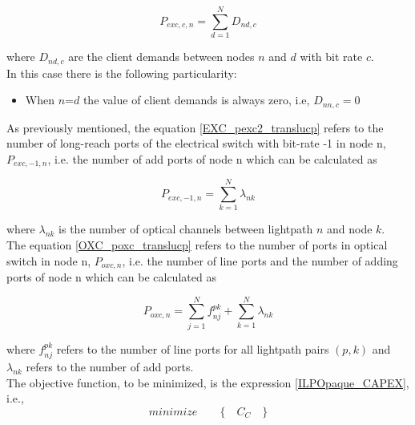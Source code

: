 \begin{equation}
P_{exc,c,n} = \sum_{d=1}^{N} D_{nd,c}
\label{EXC_pexc1_translucp}
\end{equation}

\vspace{11pt}
\noindent
where $D_{nd,c}$ are the client demands between nodes $n$ and $d$ with bit rate $c$.\\

In this case there is the following particularity:
\begin{itemize}
  \item When $n$=$d$ the value of client demands is always zero, i.e, $D_{nn,c}=0$
\end{itemize}

\vspace{11pt}
As previously mentioned, the equation \ref{EXC_pexc2_translucp} refers to the number of long-reach ports of the electrical switch with bit-rate -1 in node n, $P_{exc,-1,n}$, i.e. the number of add ports of node n which can be calculated as

\begin{equation}
P_{exc,-1,n} = \sum_{k=1}^{N} \lambda_{nk}
\label{EXC_pexc2_translucp}
\end{equation}

\vspace{11pt}
\noindent
where $\lambda_{nk}$ is the number of optical channels between lightpath $n$ and node $k$.\\

The equation \ref{OXC_poxc_translucp} refers to the number of ports in optical switch in node n, $P_{oxc,n}$, i.e. the number of line ports and the number of adding ports of node n which can be calculated as

\begin{equation}
P_{oxc,n} = \sum_{j=1}^{N} f_{nj}^{pk} + \sum_{k=1}^{N} \lambda_{nk}
\label{OXC_poxc_translucp}
\end{equation}

\vspace{11pt}
\noindent
where $f_{nj}^{pk}$ refers to the number of line ports for all lightpath pairs $(p,k)$ and $\lambda_{nk}$ refers to the number of add ports.\\

The objective function, to be minimized, is the expression \ref{ILPOpaque_CAPEX}, i.e.,
\begin{equation*}
  minimize \qquad \Big\{ \quad C_C \quad \Big\}
\end{equation*}

